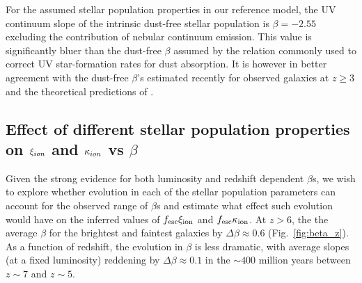 For the assumed stellar population properties in our reference model, the UV continuum slope of the intrinsic dust-free stellar population is $\beta = -2.55$ excluding the contribution of nebular continuum emission. This value is significantly bluer than the dust-free $\beta$ assumed by the \citet{Meurer:1999jm} relation commonly used to correct UV star-formation rates for dust absorption. It is however in better agreement with the dust-free $\beta$'s estimated recently for observed galaxies at $z\geq 3$ \citep{Castellano:2014db,deBarros:2014fa} and the theoretical predictions of \citet{Dayal:2012kp}. 

\subsection{Effect of different stellar population properties on $\xi_{\lowercase{ion}}$ and $\kappa_{\lowercase{ion}}$ vs $\beta$}\label{sec:beta_effect_stellar_pop}
Given the strong evidence for both luminosity and redshift dependent $\beta$s, we wish to explore whether evolution in each of the stellar population parameters can account for the observed range of $\beta$s and estimate what effect such evolution would have on the inferred values of $f_{\rm{esc}}\xi_{\rm{ion}}$ and $f_{\rm{esc}}\kappa_{\rm{ion}}$. At $z >6$, the the average $\beta$ for the brightest and faintest galaxies by $\Delta\beta \approx 0.6$ (Fig.~\ref{fig:beta_z}). As a function of redshift, the evolution in $\beta$ is less dramatic, with average slopes (at a fixed luminosity) reddening by $\Delta\beta \approx 0.1$ in the $\sim400$ million years between $z\sim7$ and $z\sim5$.

